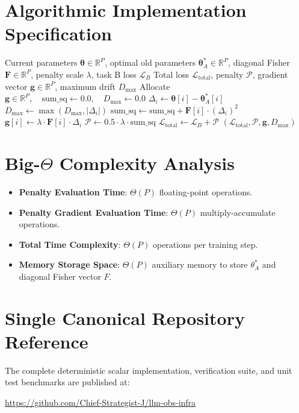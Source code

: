 \documentclass[11pt,a4paper]{article}
\theoremstyle{definition}
\begin{document}
\section{Algorithmic Implementation Specification}

\begin{algorithm}[H]
\caption{EWC Quadratic Penalty and Gradient Evaluation}
\begin{algorithmic}[1]
\Require Current parameters $\mathbf{\theta} \in \mathbb{R}^P$, optimal old parameters $\mathbf{\theta}_A^* \in \mathbb{R}^P$, diagonal Fisher $\mathbf{F} \in \mathbb{R}^P$, penalty scale $\lambda$, task B loss $\mathcal{L}_B$
\Ensure Total loss $\mathcal{L}_{\text{total}}$, penalty $\mathcal{P}$, gradient vector $\mathbf{g} \in \mathbb{R}^P$, maximum drift $D_{\max}$
\State Allocate $\mathbf{g} \in \mathbb{R}^P, \quad \text{sum\_sq} \gets 0.0, \quad D_{\max} \gets 0.0$
    \State $\Delta_i \gets \mathbf{\theta}[i] - \mathbf{\theta}_A^*[i]$
    \State $D_{\max} \gets \max(D_{\max}, |\Delta_i|)$
    \State $\text{sum\_sq} \gets \text{sum\_sq} + \mathbf{F}[i] \cdot (\Delta_i)^2$
    \State $\mathbf{g}[i] \gets \lambda \cdot \mathbf{F}[i] \cdot \Delta_i$
\EndFor
\State $\mathcal{P} \gets 0.5 \cdot \lambda \cdot \text{sum\_sq}$
\State $\mathcal{L}_{\text{total}} \gets \mathcal{L}_B + \mathcal{P}$
\State \Return $(\mathcal{L}_{\text{total}}, \mathcal{P}, \mathbf{g}, D_{\max})$
\end{algorithmic}
\end{algorithm}

\section{Big-$\Theta$ Complexity Analysis}

\begin{itemize}
    \item \textbf{Penalty Evaluation Time}: $\Theta(P)$ floating-point operations.
    \item \textbf{Penalty Gradient Evaluation Time}: $\Theta(P)$ multiply-accumulate operations.
    \item \textbf{Total Time Complexity}: $\Theta(P)$ operations per training step.
    \item \textbf{Memory Storage Space}: $\Theta(P)$ auxiliary memory to store $\theta_A^*$ and diagonal Fisher vector $F$.
\end{itemize}

\section{Single Canonical Repository Reference}

The complete deterministic scalar implementation, verification suite, and unit test benchmarks are published at:
\begin{center}
\url{https://github.com/Chief-Strategist-J/llm-obs-infra}
\end{center}
\end{document}
